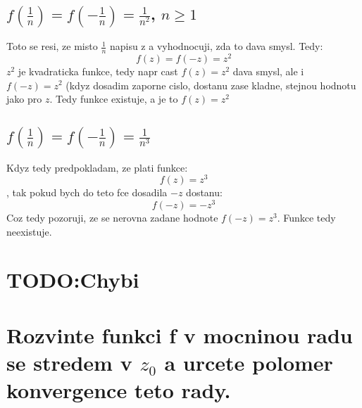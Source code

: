 \subsection*{$f(\frac{1}{n}) = f(-\frac{1}{n}) = \frac{1}{n^2}$, $n \geq 1$}
Toto se resi, ze misto $\frac{1}{n}$ napisu z a vyhodnocuji, zda to dava smysl. Tedy:
$$f(z) = f(-z) = z^2$$
$z^2$ je kvadraticka funkce, tedy napr cast $f(z) = z^2$ dava smysl, ale i $f(-z) = z^2$ (kdyz dosadim zaporne cislo, dostanu zase kladne, stejnou hodnotu jako pro $z$. Tedy funkce existuje, a je to $f(z)= z^2$

\subsection*{$f(\frac{1}{n}) = f(-\frac{1}{n}) = \frac{1}{n^3}$}
Kdyz tedy predpokladam, ze plati funkce:
$$f(z) = z^3$$, 
tak pokud bych do teto fce dosadila $-z$ dostanu:
$$f(-z) = -z^3$$
Coz tedy pozoruji, ze se nerovna zadane hodnote $f(-z) = z^3$. Funkce tedy neexistuje.


\section{TODO:Chybi}

\section{Rozvinte funkci f v mocninou radu se stredem v $z_0$ a urcete polomer konvergence teto rady.}

